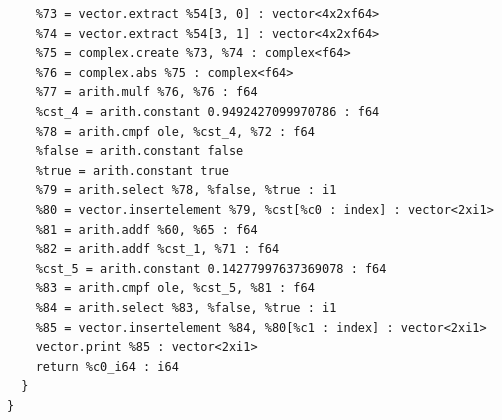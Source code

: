 \begin{verbatim}
    %73 = vector.extract %54[3, 0] : vector<4x2xf64>
    %74 = vector.extract %54[3, 1] : vector<4x2xf64>
    %75 = complex.create %73, %74 : complex<f64>
    %76 = complex.abs %75 : complex<f64>
    %77 = arith.mulf %76, %76 : f64
    %cst_4 = arith.constant 0.9492427099970786 : f64
    %78 = arith.cmpf ole, %cst_4, %72 : f64
    %false = arith.constant false
    %true = arith.constant true
    %79 = arith.select %78, %false, %true : i1
    %80 = vector.insertelement %79, %cst[%c0 : index] : vector<2xi1>
    %81 = arith.addf %60, %65 : f64
    %82 = arith.addf %cst_1, %71 : f64
    %cst_5 = arith.constant 0.14277997637369078 : f64
    %83 = arith.cmpf ole, %cst_5, %81 : f64
    %84 = arith.select %83, %false, %true : i1
    %85 = vector.insertelement %84, %80[%c1 : index] : vector<2xi1>
    vector.print %85 : vector<2xi1>
    return %c0_i64 : i64
  }
}
\end{verbatim}


